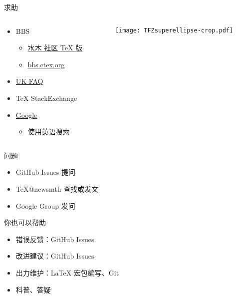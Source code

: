 \begin{frame}{求助}
	\begin{columns}[c]
		\begin{column}{.45\textwidth}
			\begin{itemize}
				\item BBS
					\begin{itemize}
						\item \href{http://www.newsmth.net/nForum/board/TeX}{水木
							社区 TeX 版}
						\item \href{http://bbs.ctex.org/}{bbs.ctex.org}
					\end{itemize}
				\item \href{http://www.tex.ac.uk/cgi-bin/texfaq2html}{UK FAQ}
				\item TeX StackExchange
				\item \href{http://justfuckinggoogleit.com/}{Google}
          \begin{itemize}
            \item 使用英语搜索
          \end{itemize}
			\end{itemize}
		\end{column}
		\begin{column}{.45\textwidth}
			\texttt{[image: TFZsuperellipse-crop.pdf]}
		\end{column}
	\end{columns}
\end{frame}

\begin{frame}{\ThuThesis 问题}
	\begin{itemize}
		\item GitHub Issues 提问
		\item \TeX @newsmth 查找或发文
		\item \href{http://groups.google.com/group/thuthesis}\ThuThesis{} Google Group 发问
	\end{itemize}
\end{frame}


\begin{frame}{你也可以帮助}
	\begin{itemize}
		\item 错误反馈：GitHub Issues
		\item 改进建议：GitHub Issues
		\item 出力维护：LaTeX 宏包编写、Git
		\item 科普、答疑%
	\end{itemize}
\end{frame}

